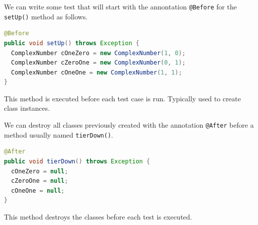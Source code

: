 \documentclass[11pt, xcolor=svgnames]{beamer}
\begin{document}
% 


%


\begin{frame}[fragile]

We can write some test that will start with the annontation \texttt{@Before} for the \texttt{setUp()} method as follows.

\begin{lstlisting}[language=Java,basicstyle=\tiny]
@Before
public void setUp() throws Exception {
  ComplexNumber cOneZero = new ComplexNumber(1, 0);
  ComplexNumber cZeroOne = new ComplexNumber(0, 1);
  ComplexNumber cOneOne = new ComplexNumber(1, 1);
}
\end{lstlisting}	
This method is executed before each test case is run. Typically used to create class instances.
\end{frame}


\begin{frame}[fragile]

We can destroy all classes previously created with the annotation  \texttt{@After} before a method usually named \texttt{tierDown()}.

\begin{lstlisting}[language=Java,basicstyle=\tiny]
@After
public void tierDown() throws Exception {
  cOneZero = null;
  cZeroOne = null;
  cOneOne = null;
}
\end{lstlisting}

This method destroys the classes before each test is executed.

\end{frame}
\end{document}
